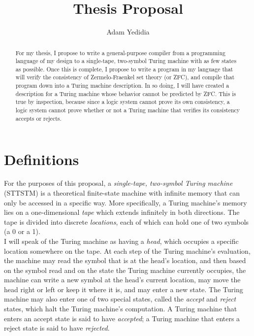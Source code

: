 \documentclass{article}
\begin{document}
\title{Thesis Proposal}
\author{Adam Yedidia}

\maketitle

\begin{abstract}
For my thesis, I propose to write a general-purpose compiler from a programming language of my design to a single-tape, two-symbol Turing machine with as few states as possible. Once this is complete, I propose to write a program in my language that will verify the consistency of Zermelo-Fraenkel set theory (or ZFC), and compile that program down into a Turing machine description. In so doing, I will have created a description for a Turing machine whose behavior cannot be predicted by ZFC. This is true by inspection, because since a logic system cannot prove its own consistency, a logic system cannot prove whether or not a Turing machine that verifies its consistency accepts or rejects.
\end{abstract}

\section{Definitions}

For the purposes of this proposal, a \emph{single-tape, two-symbol Turing machine} (STTSTM) is a theoretical finite-state machine with infinite memory that can only be accessed in a specific way. More specifically, a Turing machine's memory lies on a one-dimensional \emph{tape} which extends infinitely in both directions. The tape is divided into discrete \emph{locations}, each of which can hold one of two symbols (a 0 or a 1). \\

I will speak of the Turing machine as having a \emph{head}, which occupies a specific location somewhere on the tape. At each step of the Turing machine's evaluation, the machine may read the symbol that is at the head's location, and then based on the symbol read and on the state the Turing machine currently occupies, the machine can write a new symbol at the head's current location, may move the head right or left or keep it where it is, and may enter a new state. The Turing machine may also enter one of two special states, called the \emph{accept} and \emph{reject} states, which halt the Turing machine's computation. A Turing machine that enters an accept state is said to have \emph{accepted}; a Turing machine that enters a reject state is said to have \emph{rejected}. \\
\end{document}
